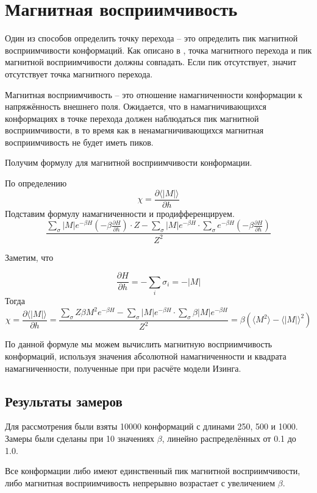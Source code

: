 \section{Магнитная восприимчивость}
Один из способов определить точку перехода -- это определить пик магнитной восприимчивости конформаций. Как описано в \cite{swendsen}, точка магнитного перехода и пик магнитной восприимчивости должны совпадать. Если пик отсутствует, значит отсутствует точка магнитного перехода.

Магнитная восприимчивость -- это отношение намагниченности конформации к напряжённость внешнего поля. Ожидается, что в намагничивающихся конформациях в точке перехода должен наблюдаться пик магнитной восприимчивости, в то время как в ненамагничивающихся магнитная восприимчивость не будет иметь пиков.

Получим формулу для магнитной восприимчивости конформации.

По определению
\[
	\chi = \frac{\partial\langle |M|\rangle}{\partial h}
\]
Подставим формулу намагниченности и продифференцируем.
\[
	\frac{\sum_\sigma {|M| e^{-\beta H} \left( -\beta \frac{\partial H}{\partial h}\right)} \cdot Z - \sum_\sigma {|M| e^{-\beta H}} \cdot \sum_\sigma {e^{-\beta H} \left( -\beta \frac{\partial H}{\partial h}\right)}}{Z^2}
\]

Заметим, что

\[
	\frac{\partial H}{\partial h} = -\sum_i\sigma_i = -|M|
\]
Тогда
\[
	\chi = \frac{\partial\langle |M|\rangle}{\partial h} = \frac{\sum_\sigma {Z\beta M^2 e^{-\beta H}} - \sum_\sigma {|M| e^{-\beta H}}\cdot \sum_\sigma {\beta |M| e^{-\beta H}}}{Z^2} = \beta \left(\langle M^2\rangle - \langle |M| \rangle^2 \right)
\]


По данной формуле мы можем вычислить магнитную восприимчивость конформаций, используя значения абсолютной намагниченности и квадрата намагниченности, полученные при при расчёте модели Изинга.



\subsection{Результаты замеров}
Для рассмотрения были взяты 10000 конформаций с длинами 250, 500 и 1000. Замеры были сделаны при 10 значениях $\beta$, линейно распределённых от 0.1 до 1.0.

Все конформации либо имеют единственный пик магнитной восприимчивости, либо магнитная восприимчивость непрерывно возрастает с увеличением $\beta$.

